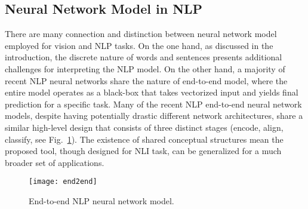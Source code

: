 

\subsection{Neural Network Model in NLP}
There are many connection and distinction between neural network model employed for vision and NLP tasks.
On the one hand, as discussed in the introduction, the discrete nature of words and sentences presents additional challenges for
interpreting the NLP model.
%
On the other hand, a majority of recent NLP neural networks share the nature of
end-to-end model, where the entire model operates as a black-box that takes
vectorized input and yields final prediction for a specific task.
%
Many of the recent NLP end-to-end neural network models, despite having potentially drastic different network architectures, share a similar high-level design that consists of three distinct stages (encode, align, classify, see Fig.~\ref{fig:modelPipeline}). 
%
The existence of shared conceptual structures mean the proposed tool, though designed for NLI task, can be generalized for a much broader set of applications.

\begin{figure}[htbp]
\centering
 \texttt{[image: end2end]}
 \vspace{-2mm}
 \caption{End-to-end NLP neural network model.}
  \vspace{-2mm}
\label{fig:modelPipeline}
\end{figure}

